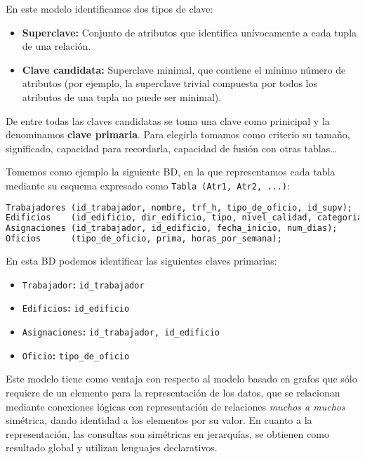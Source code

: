 En este modelo identificamos dos tipos de clave:

\begin{itemize}
	\item\textbf{Superclave:} Conjunto de atributos que identifica unívocamente a cada tupla de una relación.
	\item\textbf{Clave candidata:} Superclave minimal, que contiene el mínimo número de atributos (por ejemplo, la superclave trivial compuesta por todos los atributos de una tupla no puede ser minimal).
\end{itemize}

De entre todas las claves candidatas se toma una clave como prinicipal y la denominamos \textbf{clave primaria}.
Para elegirla tomamos como criterio su tamaño, significado, capacidad para recordarla, capacidad de fusión con otras tablas\ldots

Tomemos como ejemplo la siguiente BD, en la que representamos cada tabla mediante su esquema expresado como \texttt{Tabla (Atr1, Atr2, ...)}:

\begin{lstlisting}[language=SQL]
Trabajadores (id_trabajador, nombre, trf_h, tipo_de_oficio, id_supv);
Edificios    (id_edificio, dir_edificio, tipo, nivel_calidad, categoria);
Asignaciones (id_trabajador, id_edificio, fecha_inicio, num_dias);
Oficios      (tipo_de_oficio, prima, horas_por_semana);
\end{lstlisting}

En esta BD podemos identificar las siguientes claves primarias:

\begin{itemize}
	\item\texttt{Trabajador}\textbf{:} \texttt{id\_trabajador}
	\item\texttt{Edificios}\textbf{:} \texttt{id\_edificio}
	\item\texttt{Asignaciones}\textbf{:} \texttt{id\_trabajador, id\_edificio}
	\item\texttt{Oficio}\textbf{:} \texttt{tipo\_de\_oficio}
\end{itemize}

Este modelo tiene como ventaja con respecto al modelo basado en grafos que sólo requiere de un elemento para la representación de los datos, que se relacionan mediante conexiones lógicas con representación de relaciones \textit{muchos a muchos} simétrica, dando identidad a los elementos por su valor.
En cuanto a la representación, las consultas son simétricas en jerarquías, se obtienen como resultado global y utilizan lenguajes declarativos.
